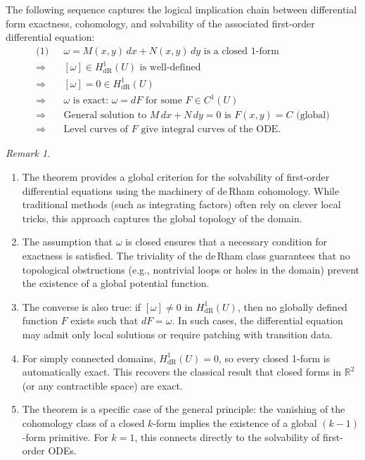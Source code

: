 \documentclass{amsart}
\theoremstyle{definition}
\theoremstyle{remark}
\newtheorem{remark}[theorem]{Remark}
\numberwithin{equation}{section}
\begin{document}
The following sequence captures the logical implication chain between differential form exactness, cohomology, and solvability of the associated first-order differential equation:
\begin{align*}
    \text{(1) } & \omega = M(x, y)\,dx + N(x, y)\,dy \text{ is a closed 1-form} \\
    \Rightarrow\quad & [\omega] \in H^1_{\text{dR}}(U) \text{ is well-defined} \\
    \Rightarrow\quad & [\omega] = 0 \in H^1_{\text{dR}}(U) \\
    \Rightarrow\quad & \omega \text{ is exact: } \omega = dF \text{ for some } F \in C^1(U) \\
    \Rightarrow\quad & \text{General solution to } M\, dx + N\, dy = 0 \text{ is } F(x, y) = C \text{ (global)} \\
    \Rightarrow\quad & \text{Level curves of } F \text{ give integral curves of the ODE}.
\end{align*}
\begin{remark}
\hfill
\begin{enumerate}
    \item The theorem provides a global criterion for the solvability of first-order differential equations using the machinery of de\,Rham cohomology. While traditional methods (such as integrating factors) often rely on clever local tricks, this approach captures the global topology of the domain.

    \item The assumption that \( \omega \) is closed ensures that a necessary condition for exactness is satisfied. The triviality of the de\,Rham class guarantees that no topological obstructions (e.g., nontrivial loops or holes in the domain) prevent the existence of a global potential function.

    \item The converse is also true: if \( [\omega] \ne 0 \) in \( H^1_{\mathrm{dR}}(U) \), then no globally defined function \( F \) exists such that \( dF = \omega \). In such cases, the differential equation may admit only local solutions or require patching with transition data.

    \item For simply connected domains, \( H^1_{\mathrm{dR}}(U) = 0 \), so every closed 1-form is automatically exact. This recovers the classical result that closed forms in \( \mathbb{R}^2 \) (or any contractible space) are exact.

    \item The theorem is a specific case of the general principle: the vanishing of the cohomology class of a closed \( k \)-form implies the existence of a global \( (k-1) \)-form primitive. For \( k = 1 \), this connects directly to the solvability of first-order ODEs.
\end{enumerate}
\end{remark}
\end{document}
